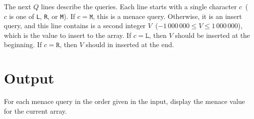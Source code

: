 The next $Q$ lines describe the queries. Each line starts with a single character $c$~($c$ is one of \texttt{L}, \texttt{R}, or \texttt{M}). If $c = \texttt{M}$, this is a menace query. Otherwise, it is an insert query, and this line contains is a second integer $V$~($-1\,000\,000 \leq V \leq 1\,000\,000$), which is the value to insert to the array. If $c = \texttt{L}$, then $V$ should be inserted at the beginning. If $c = \texttt{R}$, then $V$ should in inserted at the end.


\section*{Output}

For each menace query in the order given in the input, display the menace value for the current array.

